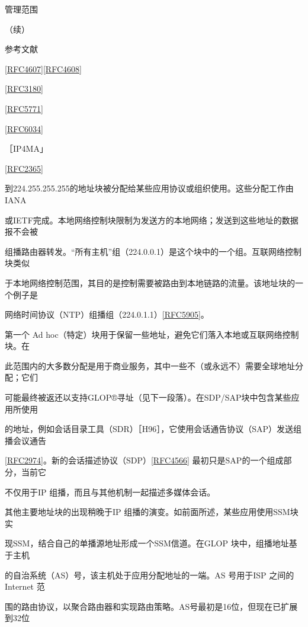管理范围

（续）

参考文献

\href{https://www.rfc-editor.org/rfc/rfc4607}{[RFC4607]}\href{https://www.rfc-editor.org/rfc/rfc4608}{[RFC4608]}

\href{https://www.rfc-editor.org/rfc/rfc3180}{[RFC3180]}

\href{https://www.rfc-editor.org/rfc/rfc5771}{[RFC5771]}

\href{https://www.rfc-editor.org/rfc/rfc6034}{[RFC6034]}

［IP4MA」

\href{https://www.rfc-editor.org/rfc/rfc2365}{[RFC2365]}

到224.255.255.255的地址块被分配给某些应用协议或组织使用。这些分配工作由IANA

或IETF完成。本地网络控制块限制为发送方的本地网络；发送到这些地址的数据报不会被

组播路由器转发。“所有主机”组（224.0.0.1）是这个块中的一个组。互联网络控制块类似

于本地网络控制范围，其目的是控制需要被路由到本地链路的流量。该地址块的一个例子是

网络时间协议（NTP）组播组（224.0.1.1）\href{https://www.rfc-editor.org/rfc/rfc5905}{[RFC5905]}。

第一个 Ad hoc（特定）块用于保留一些地址，避免它们落入本地或互联网络控制块。在

此范围内的大多数分配是用于商业服务，其中一些不（或永远不）需要全球地址分配；它们

可能最终被返还以支持GLOP®寻址（见下一段落）。在SDP/SAP块中包含某些应用所使用

的地址，例如会话目录工具（SDR）［H96］，它使用会话通告协议（SAP）发送组播会议通告

\href{https://www.rfc-editor.org/rfc/rfc2974}{[RFC2974]}。新的会话描述协议（SDP）\href{https://www.rfc-editor.org/rfc/rfc4566}{[RFC4566]} 最初只是SAP的一个组成部分，当前它

不仅用于IP 组播，而且与其他机制一起描述多媒体会话。

其他主要地址块的出现稍晚于IP 组播的演变。如前面所述，某些应用使用SSM块实

现SSM，结合自己的单播源地址形成一个SSM信道。在GLOP 块中，组播地址基于主机

的自治系统（AS）号，该主机处于应用分配地址的一端。AS 号用于ISP 之间的 Internet 范

围的路由协议，以聚合路由器和实现路由策略。AS号最初是16位，但现在已扩展到32位

